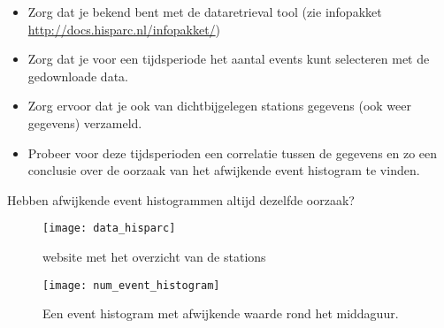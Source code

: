 \begin{questions}
\begin{EnvUplevel}
\begin{itemize}
    \item Zorg dat je bekend bent met de dataretrieval tool
    (zie infopakket \url{http://docs.hisparc.nl/infopakket/})
    \item Zorg dat je voor een tijdsperiode het aantal events kunt selecteren met de gedownloade data.
    \item Zorg ervoor dat je ook van dichtbijgelegen stations gegevens (ook
    weer gegevens) verzameld.
    \item Probeer voor deze tijdsperioden een
    correlatie tussen de gegevens en zo een conclusie over de oorzaak van
    het afwijkende event histogram te vinden.
\end{itemize}
\end{EnvUplevel}



\question Hebben afwijkende event histogrammen altijd dezelfde oorzaak?

\begin{figure}
    \centering
    \texttt{[image: data\_hisparc]}
    \caption{website met het overzicht van de stations}
    \label{fig:data_hisparc}
\end{figure}

\begin{figure}
    \centering
    \texttt{[image: num\_event\_histogram]}
    \caption{Een event histogram met afwijkende waarde rond het middaguur.}
    \label{fig:Event_histogram}
\end{figure}

\end{questions}

